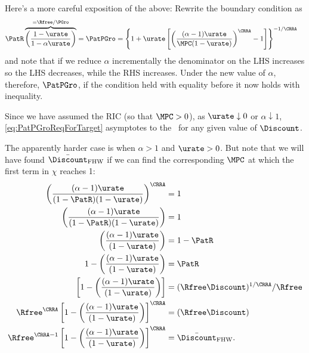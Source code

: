 \documentclass{\handout}
\begin{document}
\begin{CDCPrivate}
Here's a more careful exposition of the above:
Rewrite the boundary condition as 
\begin{equation}\begin{gathered}\begin{aligned}
  \PatR \overbrace{\left(\frac{1-\urate}{1-\alpha \urate}\right)}^{=\Rfree/\PGro}= \PatPGro & =  \left\{1  + \urate \left[\left(\frac{(\alpha-1)\urate}{\MPCU (1-\urate)}\right)^{\CRRA}-1\right] \right\}^{-1/\CRRA} \notag
\end{aligned}\end{gathered}\end{equation}
and note that if we reduce $\alpha$ incrementally the denominator on the LHS increases so the LHS decreases, while the RHS increases.  Under the new value of $\alpha$, therefore, $\PatPGro$, if the condition held with equality before it now holds with inequality.  

\end{CDCPrivate}

Since we have assumed the RIC (so that $\MPCU > 0$), as $\urate \downarrow 0$ or $\alpha \downarrow 1$, \eqref{eq:PatPGroReqForTarget} asymptotes to the \GICPGro~for any given value of $\Discount$.  

The apparently harder case is when $\alpha>1$ and $\urate > 0$.  But note that we will have found $\DiscountMaxGICWhenFHWCTBSHolds$ if we can find the corresponding $\MPCU$ at which the first term in $\chi$ reaches 1:
\begin{equation}\begin{gathered}\begin{aligned}
    \left(\frac{(\alpha-1)\urate}{(1-\PatR) (1-\urate)}\right)^{\CRRA} & =  1
\\  \left(\frac{(\alpha-1)\urate}{(1-\PatR) (1-\urate)}\right) & =  1
\\  \left(\frac{(\alpha-1)\urate}{ (1-\urate)}\right) & =  1-\PatR
\\  1-\left(\frac{(\alpha-1)\urate}{ (1-\urate)}\right) & =  \PatR
\\                  \left[1-\left(\frac{(\alpha-1)\urate}{ (1-\urate)}\right)\right] & =  (\Rfree \Discount)^{1/\CRRA}/\Rfree
\\  \Rfree^{\CRRA}  \left[1-\left(\frac{(\alpha-1)\urate}{ (1-\urate)}\right)\right]^{\CRRA} & =  (\Rfree \Discount)
\\  \Rfree^{\CRRA-1}\left[1-\left(\frac{(\alpha-1)\urate}{ (1-\urate)}\right)\right]^{\CRRA} & =  \DiscountMaxGICWhenFHWCTBSHolds \label{eq:DiscountMaxGICWhenFHWCTBSHoldsAndGICPGroIsExactlySatisfied}
.\end{aligned}\end{gathered}\end{equation}
\end{document}
